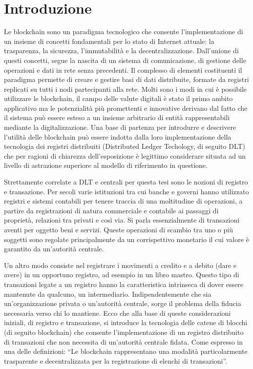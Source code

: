 \chapter{Introduzione}

Le blockchain sono un paradigma tecnologico che consente l’implementazione di un insieme di concetti fondamentali per lo stato di Internet attuale: la trasparenza, la sicurezza, l’immutabilità e la decentralizzazione. Dall’unione di questi concetti, segue la nascita di un sistema di comunicazione, di gestione delle operazioni e dati in rete senza precedenti. Il complesso di elementi costituenti il paradigma permette di creare e gestire basi di dati distribuite, formate da registri replicati su tutti i nodi partecipanti alla rete. Molti sono i modi in cui è possibile utilizzare le blockchain, il campo delle valute digitali è stato il primo ambito applicativo ma le potenzialità più promettenti e innovative derivano dal fatto che il sistema può essere esteso a un insieme arbitrario di entità rappresentabili mediante la digitalizzazione. 
Una base di partenza per introdurre e descrivere l’utilità delle blockchain può essere indotta dalla loro implementazione della tecnologia dei registri distribuiti (Distributed Ledger Techology, di seguito DLT) che per ragioni di chiarezza dell’esposizione è legittimo considerare situata ad un livello di astrazione superiore al modello di riferimento in questione. 

Strettamente correlate a DLT e centrali per questa tesi sono le nozioni di registro e transazione. Per secoli varie istituzioni tra cui banche e governi hanno utilizzato registri e sistemi contabili per tenere traccia di una moltitudine di operazioni, a partire da registrazioni di natura commerciale e contabile ai passaggi di proprietà, relazioni tra privati e così via. Si parla essenzialmente di transazioni aventi per oggetto beni e servizi. Queste operazioni di scambio tra uno o più soggetti sono regolate principalmente da un corrispettivo monetario il cui valore è garantito da un’autorità centrale.

Un altro modo consiste nel registrare i movimenti a credito e a debito (dare e avere) in un opportuno registro, ad esempio in un libro mastro. Questo tipo di transazioni legate a un registro hanno la caratteristica intrinseca di dover essere mantenute da qualcuno, un intermediario. Indipendentemente che sia un’organizzazione privata o un’autorità centrale, sorge il problema della fiducia necessaria verso chi lo mantiene. Ecco che alla base di queste considerazioni iniziali, di registro e transazione, si introduce la tecnologia delle catene di blocchi (di seguito blockchain) che consente l’implementazione di un registro distribuito di transazioni che non necessita di un'autorità centrale fidata. Come espresso in una delle definizioni: “Le blockchain rappresentano una modalità particolarmente trasparente e decentralizzata per la registrazione di elenchi di transazioni”.

